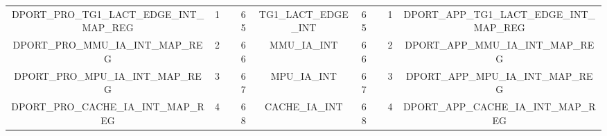 \begin{landscape}
\begin{tiny}
\begin{longtable}[c]{|*{10}{c|}}
      \cline{1-2} \cline{4-7} \cline{9-10}
      DPORT\_PRO\_TG1\_LACT\_EDGE\_INT\_MAP\_REG &1& &65& \multicolumn{2}{c|}{TG1\_LACT\_EDGE\_INT} &65& &1&DPORT\_APP\_TG1\_LACT\_EDGE\_INT\_MAP\_REG\\
      \cline{1-2} \cline{4-7} \cline{9-10}
     DPORT\_PRO\_MMU\_IA\_INT\_MAP\_REG & 2& &66& \multicolumn{2}{c|}{MMU\_IA\_INT}&66& &2& DPORT\_APP\_MMU\_IA\_INT\_MAP\_REG\\
     \cline{1-2} \cline{4-7} \cline{9-10}
     DPORT\_PRO\_MPU\_IA\_INT\_MAP\_REG&3& &67&\multicolumn{2}{c|}{MPU\_IA\_INT}&67& &3&DPORT\_APP\_MPU\_IA\_INT\_MAP\_REG\\
     \cline{1-2} \cline{4-7} \cline{9-10}
      DPORT\_PRO\_CACHE\_IA\_INT\_MAP\_REG & 4& &68& \multicolumn{2}{c|}{CACHE\_IA\_INT}&68& &4& DPORT\_APP\_CACHE\_IA\_INT\_MAP\_REG
    \\\hline
      
    \end{longtable}
    \end{tiny}
    \end{landscape}
